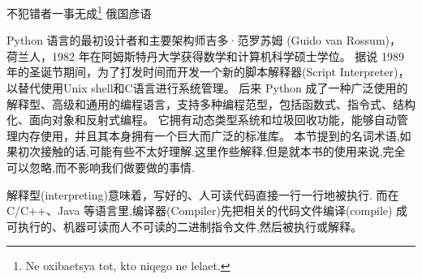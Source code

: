 \documentclass[main.tex]{subfiles}
\begin{document}

不犯错者一事无成\footnote{{\selectfont Ne oxibaet{}s{ya} tot, kto niqego ne lelaet.}}
俄国彦语

Python 语言的最初设计者和主要架构师吉多·范罗苏姆 (Guido van Rossum)， 荷兰人，1982 年在阿姆斯特丹大学获得数学和计算机科学硕士学位。
据说 1989 年的圣诞节期间，为了打发时间而开发一个新的脚本解释器(Script Interpreter)，以替代使用Unix shell和C语言进行系统管理。
后来 Python 成了一种广泛使用的解释型、高级和通用的编程语言，支持多种编程范型，包括函数式、指令式、结构化、面向对象和反射式编程。
它拥有动态类型系统和垃圾回收功能，能够自动管理内存使用，并且其本身拥有一个巨大而广泛的标准库。
本节提到的名词术语,如果初次接触的话,可能有些不太好理解.这里作些解释,但是就本书的使用来说,完全可以忽略,而不影响我们做要做的事情.

解释型(interpreting)意味着，写好的、人可读代码直接一行一行地被执行. 而在 C/C++、Java 等语言里,编译器(Compiler)先把相关的代码文件编译(compile)
成可执行的、机器可读而人不可读的二进制指令文件,然后被执行或解释。
\end{document}
